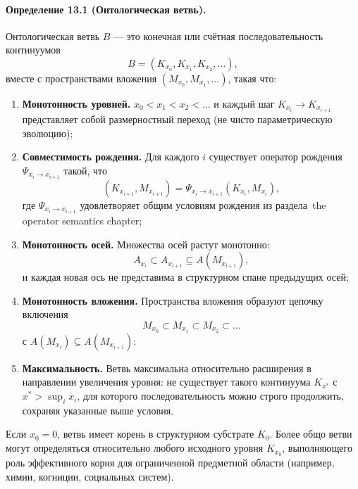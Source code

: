 \paragraph{Определение 13.1 (Онтологическая ветвь).}
Онтологическая ветвь \(B\) — это конечная или счётная последовательность
континуумов
\[
  B = (K_{x_0}, K_{x_1}, K_{x_2}, \dots),
\]
вместе с пространствами вложения \((M_{x_0}, M_{x_1}, \dots)\), такая что:
\begin{enumerate}
  \item \textbf{Монотонность уровней.}\quad
        \(x_0 < x_1 < x_2 < \dots\) и каждый шаг
        \(K_{x_i} \to K_{x_{i+1}}\) представляет собой размерностный
        переход (не чисто параметрическую эволюцию);
  \item \textbf{Совместимость рождения.}\quad
        Для каждого \(i\) существует оператор рождения
        \(\Psi_{x_i\to x_{i+1}}\) такой, что
        \[
          (K_{x_{i+1}}, M_{x_{i+1}}) =
            \Psi_{x_i\to x_{i+1}}(K_{x_i}, M_{x_i}),
        \]
        где \(\Psi_{x_i\to x_{i+1}}\) удовлетворяет общим условиям рождения
        из раздела~the operator semantics chapter;
  \item \textbf{Монотонность осей.}\quad
        Множества осей растут монотонно:
        \[
          A_{x_i} \subset A_{x_{i+1}}
          \subseteq A(M_{x_{i+1}}),
        \]
        и каждая новая ось не представима в структурном спане предыдущих осей;
  \item \textbf{Монотонность вложения.}\quad
        Пространства вложения образуют цепочку включения
        \[
          M_{x_0} \subset M_{x_1} \subset M_{x_2} \subset \dots
        \]
        с \(A(M_{x_i}) \subseteq A(M_{x_{i+1}})\);
  \item \textbf{Максимальность.}\quad
        Ветвь максимальна относительно расширения в направлении увеличения
        уровня: не существует такого континуума \(K_{x^{\ast}}\) с
        \(x^{\ast} > \sup_i x_i\), для которого последовательность можно
        строго продолжить, сохраняя указанные выше условия.
\end{enumerate}

Если \(x_0 = 0\), ветвь имеет корень в структурном субстрате \(K_0\). Более
общо ветви могут определяться относительно любого исходного уровня
\(K_{x_0}\), выполняющего роль эффективного корня для ограниченной
предметной области (например, химии, когниции, социальных систем).

